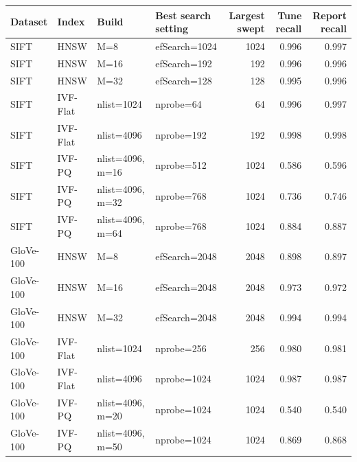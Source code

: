 \begin{tabular}{llllrrr}
\toprule
Dataset & Index & Build & Best search setting & Largest swept & Tune recall & Report recall \\
\midrule
SIFT & HNSW & M=8 & efSearch=1024 & 1024 & 0.996 & 0.997 \\
SIFT & HNSW & M=16 & efSearch=192 & 192 & 0.996 & 0.996 \\
SIFT & HNSW & M=32 & efSearch=128 & 128 & 0.995 & 0.996 \\
SIFT & IVF-Flat & nlist=1024 & nprobe=64 & 64 & 0.996 & 0.997 \\
SIFT & IVF-Flat & nlist=4096 & nprobe=192 & 192 & 0.998 & 0.998 \\
SIFT & IVF-PQ & nlist=4096, m=16 & nprobe=512 & 1024 & 0.586 & 0.596 \\
SIFT & IVF-PQ & nlist=4096, m=32 & nprobe=768 & 1024 & 0.736 & 0.746 \\
SIFT & IVF-PQ & nlist=4096, m=64 & nprobe=768 & 1024 & 0.884 & 0.887 \\
GloVe-100 & HNSW & M=8 & efSearch=2048 & 2048 & 0.898 & 0.897 \\
GloVe-100 & HNSW & M=16 & efSearch=2048 & 2048 & 0.973 & 0.972 \\
GloVe-100 & HNSW & M=32 & efSearch=2048 & 2048 & 0.994 & 0.994 \\
GloVe-100 & IVF-Flat & nlist=1024 & nprobe=256 & 256 & 0.980 & 0.981 \\
GloVe-100 & IVF-Flat & nlist=4096 & nprobe=1024 & 1024 & 0.987 & 0.987 \\
GloVe-100 & IVF-PQ & nlist=4096, m=20 & nprobe=1024 & 1024 & 0.540 & 0.540 \\
GloVe-100 & IVF-PQ & nlist=4096, m=50 & nprobe=1024 & 1024 & 0.869 & 0.868 \\
\bottomrule
\end{tabular}
